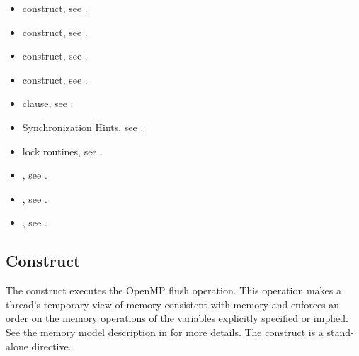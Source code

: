 \crossreferences
\begin{itemize}
\item {} construct, see
.

\item {} construct, see
.

\item {} construct, see
.

\item {} construct, see
.

\item {} clause, see
.

\item Synchronization Hints, see
.

\item lock routines, see .

\item {}, see
.

\item {}, see
.

\item {}, see
.

\end{itemize}









\subsection{ Construct}
\label{subsec:flush Construct}
\summary
The  construct executes the OpenMP flush operation. This operation makes a
thread's temporary view of memory consistent with memory and enforces an order on
the memory operations of the variables explicitly specified or implied. See the memory
model description in  for more details. The  construct is a
stand-alone directive.

